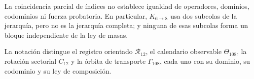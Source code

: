 La coincidencia parcial de índices no establece igualdad de operadores,
dominios, codominios ni fuerza probatoria. En particular,
\(K_{6\to8}\) usa dos subcolas de la jerarquía, pero no es la jerarquía
completa; y ninguna de esas subcolas forma un bloque independiente de la ley
de masas.

\begin{remark}
La notación distingue el registro orientado \(\mathcal R_{12}\), el
calendario observable \(\Theta_{108}\), la rotación sectorial \(C_{12}\) y
la órbita de transporte \(\Gamma_{108}\), cada uno con su dominio, su
codominio y su ley de composición.
\end{remark}
